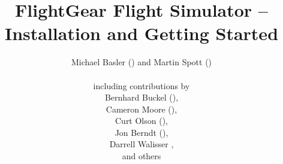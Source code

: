 
\thispagestyle{empty}
\title{FlightGear Flight Simulator -- Installation and Getting Started}

\author{
 Michael Basler () and Martin Spott ()\\\\
  including contributions by\\
  Bernhard Buckel (),\\
  Cameron Moore (),\\
  Curt Olson (),\\
  Jon Berndt (),\\
  Darrell Walisser {},\\  
  and others\\
{ \setlength{\fboxsep}{12mm}\setlength{\fboxrule}{0pt}
 \centerline{}}}

